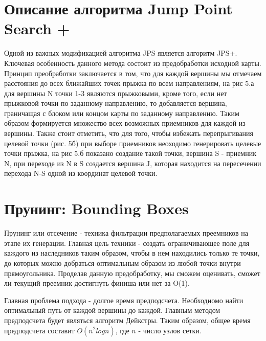 \documentclass{physlab}
\begin{document}
\section{Описание алгоритма Jump Point Search +}
\begin{figure}[H]
\begin{minipage}[h]{0.50\linewidth}
\end{minipage}
\hfill
\begin{minipage}[h]{0.48\linewidth}
\end{minipage}
\caption{}
\end{figure} 
Одной из важных модификацией алгоритма JPS является алгоритм JPS+. Ключевая особенность данного метода состоит из предобработки исходной карты. Принцип преобработки заключается в том, что для каждой вершины мы отмечаем расстояния до всех ближайших точек прыжка по всем направлениям, на рис 5.а для вершины N точки 1-3 являются прыжковыми, кроме того, если нет прыжковой точки по заданному направлению, то добавляется вершина, граничащая с блоком или концом карты по заданному направлению. Таким образом формируется множество всех возможных приемников для каждой из вершины. Также стоит отметить, что для того, чтобы избежать перепрыгивания целевой точки (рис. 5б) при выборе приемников неоходимо генерировать целевые точки прыжка, на рис 5.б показано создание такой точки, вершина S - приемник N, при переходе из N в S создается вершина J, которая находится на пересечении перехода N-S одной из координат целевой точки.

\section{Прунинг: Bounding Boxes}
Прунинг или отсечение - техника фильтрации предполагаемых преемников на этапе их генерации. Главная цель техники - создать ограничивающее поле для каждого из наследников таким образом, чтобы в нем находились только те точки, до которых можно добраться оптимальным образом из любой точки внутри прямоугольника. Проделав данную предобработку, мы сможем оценивать, сможет ли текущий преемник достигнуть финиша или нет за O(1).

Главная проблема подхода - долгое время предподсчета. Необходиомо найти оптимальный путь от каждой вершины до каждой. Главным методом предподсчета будет являться алгоритм Дейкстры. Таким образом, общее время предподсчета составит $O(n^2logn)$, где $n$ - число узлов сетки.
\end{document}
